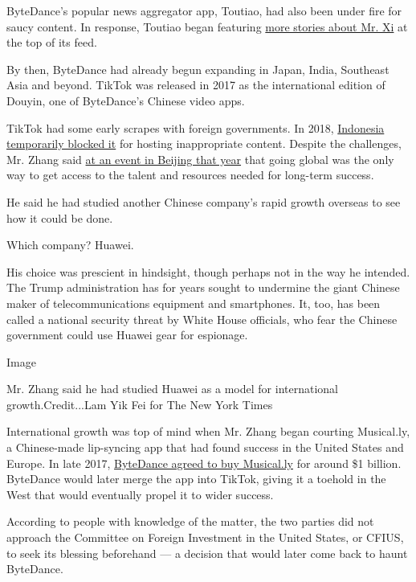 ByteDance's popular news aggregator app, Toutiao, had also been under
fire for saucy content. In response, Toutiao began featuring
\href{https://www.nytimes3xbfgragh.onion/2018/01/02/business/china-toutiao-censorship.html}{more
stories about Mr. Xi} at the top of its feed.

By then, ByteDance had already begun expanding in Japan, India,
Southeast Asia and beyond. TikTok was released in 2017 as the
international edition of Douyin, one of ByteDance's Chinese video apps.

TikTok had some early scrapes with foreign governments. In 2018,
\href{https://www.nytimes3xbfgragh.onion/2018/10/29/technology/bytedance-app-funding-china.html}{Indonesia
temporarily blocked it} for hosting inappropriate content. Despite the
challenges, Mr. Zhang said
\href{https://www.techbuzzchina.com/bytedance/bytedance-ceo-zhang-yiming-at-tsinghua-university-part-3}{at
an event in Beijing that year} that going global was the only way to get
access to the talent and resources needed for long-term success.

He said he had studied another Chinese company's rapid growth overseas
to see how it could be done.

Which company? Huawei.

His choice was prescient in hindsight, though perhaps not in the way he
intended. The Trump administration has for years sought to undermine the
giant Chinese maker of telecommunications equipment and smartphones. It,
too, has been called a national security threat by White House
officials, who fear the Chinese government could use Huawei gear for
espionage.

Image

Mr. Zhang said he had studied Huawei as a model for international
growth.Credit...Lam Yik Fei for The New York Times

International growth was top of mind when Mr. Zhang began courting
Musical.ly, a Chinese-made lip-syncing app that had found success in the
United States and Europe. In late 2017,
\href{https://www.nytimes3xbfgragh.onion/2017/11/10/business/dealbook/musically-sold-app-video.html}{ByteDance
agreed to buy Musical.ly} for around \$1 billion. ByteDance would later
merge the app into TikTok, giving it a toehold in the West that would
eventually propel it to wider success.

According to people with knowledge of the matter, the two parties did
not approach the Committee on Foreign Investment in the United States,
or CFIUS, to seek its blessing beforehand --- a decision that would
later come back to haunt ByteDance.

